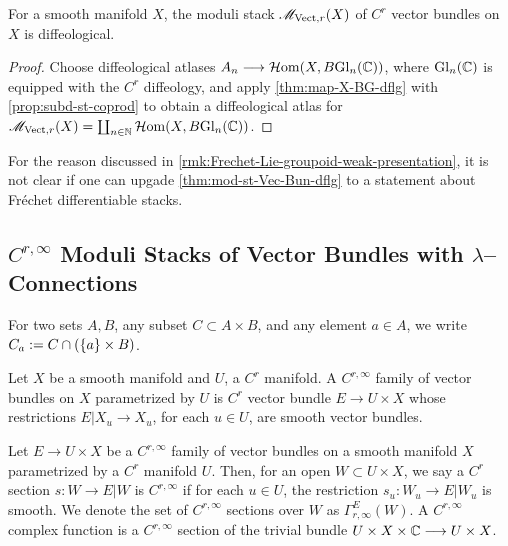 \documentclass[11pt]{amsart}
\begin{document}
\begin{thm}\label{thm:mod-st-Vec-Bun-dflg}
For a smooth manifold $X$, the moduli stack $\mathscr{M}_{\mathrm{Vect}, r}(X)$ of $C^r$ vector bundles on $X$
is diffeological.
\end{thm}
\begin{proof}
Choose diffeological atlases $A_n \to \HHom(X, B\Gl_n(\bC))$, where $\mathrm{Gl}_n(\mathbb{C})$ is equipped with
the $C^r$ diffeology, and apply \cref{thm:map-X-BG-dflg} with \cref{prop:subd-st-coprod} to
obtain a diffeological atlas for $\mathscr{M}_{\mathrm{Vect}, r}(X) = \coprod_{n \in \mathbb{N}} \mathcal{H}\mathrm{om}(X, B\mathrm{Gl}_n(\mathbb{C}))$.
\end{proof}

\begin{rmk}\label{rmk:mod-st-Vec-Bun-Frechet-Lie-groupoid-weak-presentation}
For the reason discussed in \cref{rmk:Frechet-Lie-groupoid-weak-presentation},
it is not clear if one can upgade \cref{thm:mod-st-Vec-Bun-dflg} to a statement about Fr\'echet
differentiable stacks.
\end{rmk}

\subsection{$C^{r, \infty}$ Moduli Stacks of Vector Bundles with $\lambda$--Connections}
\label{subsec:M-Flt-r}

\begin{notn}
For two sets $A, B$, any subset $C \subset A \times B$, and any element $a \in A$, we write
$C_a := C \cap (\set{a} \times B)$.
\end{notn}

\begin{defn}
Let $X$ be a smooth manifold and $U$, a $C^r$ manifold.
A $C^{r, \infty}$ family of vector bundles on $X$ parametrized by $U$
is $C^r$ vector bundle $E \to U \times X$ whose restrictions $E|X_u \to X_u$, for each $u \in U$,
are smooth vector bundles.
\end{defn}

\begin{defn}\label{defn:Cr-inf-sec}
Let $E \to U \times X$ be a $C^{r, \infty}$ family of vector bundles on a smooth manifold $X$
parametrized by a $C^r$ manifold $U$. Then, for an open $W \subset U \times X$,
we say a $C^r$ section $s : W \to E|W$ is $C^{r, \infty}$ if for each $u \in U$,
the restriction $s_u : W_u \to E|W_u$ is smooth.
We denote the set of $C^{r, \infty}$ sections over $W$ as $\Gamma_{r, \infty}^E(W)$.
A $C^{r, \infty}$ complex function is a $C^{r, \infty}$ section of the trivial bundle
$U \times X \times \bC \to U \times X$.
\end{defn}
\end{document}
